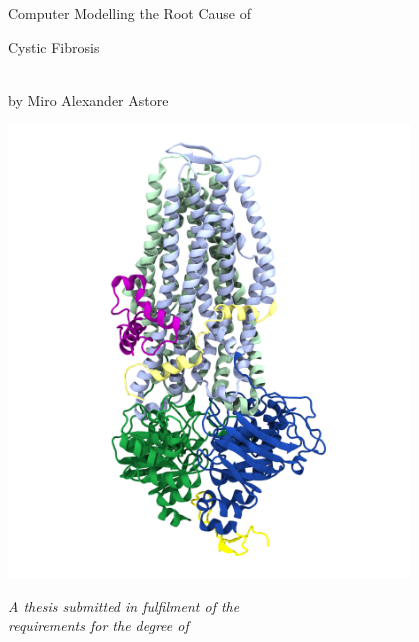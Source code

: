 
\begin{titlepage}

\begin{center}

\vspace*{0.1in}

\begin{LARGE}
Computer Modelling the Root Cause of  \\ 
\end{LARGE}
\vspace*{0.1in}
\begin{LARGE}
Cystic Fibrosis
\end{LARGE}
\begin{large} \\
\vspace{0.1in}
by Miro Alexander Astore

\includegraphics[width=0.8\textwidth]{figures/CFTR_skeleton.png}
\vspace{-0.05in}

\textit{A thesis submitted in fulfilment of the}\\
\textit{requirements for the degree of}


\end{large}
\end{center}
\end{titlepage}
